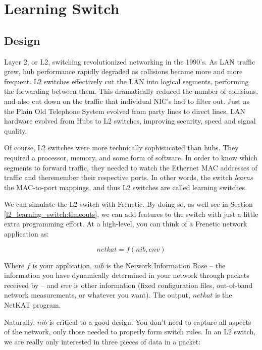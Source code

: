 
\chapter{Learning Switch}

\section{Design}
\label{l2_learning_switch:design}

Layer 2, or L2, switching revolutionized networking in the 1990's.
As LAN traffic grew, hub performance rapidly degraded as collisions became more and more frequent.
L2 switches effectively cut the LAN into logical segments, performing the forwarding between them.
This dramatically reduced the number of collisions, and also cut down on the traffic that individual
NIC's had to filter out.  Just as the Plain Old 
Telephone System evolved from party lines to direct lines, LAN hardware evolved from Hubs to 
L2 switches, improving security, speed and signal quality.

Of course, L2 switches were more technically sophisticated than hubs.  They required a processor, memory, and 
some form of software.  In order to know which segments to forward traffic, they needed to 
watch the Ethernet MAC addresses of traffic and theremember their respective ports.  In other words, the switch 
\emph{learns} the MAC-to-port mappings, and thus L2 switches are called learning switches.    

We can simulate the L2 switch with Frenetic.  By doing so, as well see in 
Section \ref{l2_learning_switch:timeouts},
we can add features to the switch with just a little extra programming effort.  At a high-level, 
you can think of a Frenetic network application as:

$$ netkat = f( nib, env ) $$

Where $f$ is your application, $nib$ is the Network Information Base -- the information you have dynamically determined in your network through
packets received by  -- and
$env$ is other information (fixed configuration files, out-of-band network measurements, or whatever you want).  
The output, $netkat$ is the NetKAT program.

Naturally, $nib$ is critical to a good design.  You don't need to capture all aspects of the network,
only those needed to properly form switch rules.  In an L2 switch, we are really only interested in three 
pieces of data in a packet:

